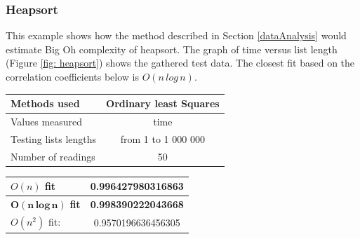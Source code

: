 \documentclass{article}
\begin{document}
\newpage
            \subsubsection{Heapsort}
             This example shows how the method described in Section \ref{dataAnalysis} would estimate Big Oh complexity of heapsort. The graph of time versus list length (Figure \ref{fig: heapsort}) shows the gathered test data. The closest fit based on the correlation coefficients below is $O(n\,log \,n)$.\\
            \noindent
            \begin{minipage}{0.45\textwidth}
            \centering
            \begin{tabular}{|l|c|}
                \hline
                Methods used & Ordinary least Squares \\
                \hline
                Values measured & time \\
                \hline
                Testing lists lengths &  from 1 to 1 000 000\\
                \hline
                Number of readings & 50 \\
                \hline
                \end{tabular}
                
            \vspace{1cm}
            \begin{tabular}{|l|c|}
                \hline
                $O(n)$ fit & 0.996427980316863 \\
                \hline
                $\mathbf{O(n\,log\,n)}$ \textbf{fit} & \textbf{0.998390222043668} \\
                \hline
                $O(n^2)$ fit: & 0.9570196636456305 \\
                \hline
                
            \end{tabular}

            \end{minipage}
\end{document}
